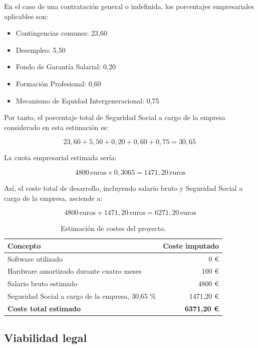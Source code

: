 En el caso de una contratación general o indefinida, los porcentajes empresariales aplicables son:

\begin{itemize}
\item Contingencias comunes: 23,60 %
\item Desempleo: 5,50 %
\item Fondo de Garantía Salarial: 0,20 %
\item Formación Profesional: 0,60 %
\item Mecanismo de Equidad Intergeneracional: 0,75 %
\end{itemize}

Por tanto, el porcentaje total de Seguridad Social a cargo de la empresa considerado en esta estimación es:

\[
23{,}60 + 5{,}50 + 0{,}20 + 0{,}60 + 0{,}75
= 30{,}65\,%
\]

La cuota empresarial estimada sería:

\[
4800\,\text{euros} \times 0{,}3065
= 1471{,}20\,\text{euros}
\]

Así, el coste total de desarrollo, incluyendo salario bruto y Seguridad Social a cargo de la empresa, asciende a:

\[
4800\,\text{euros} + 1471{,}20\,\text{euros}
= 6271{,}20\,\text{euros}
\]

\begin{table}[H]
\centering
\small
\renewcommand{\arraystretch}{1.2}
\begin{tabularx}{0.85\textwidth}{X r}
\toprule
\textbf{Concepto} & \textbf{Coste imputado} \\
\midrule
Software utilizado & 0 € \\
Hardware amortizado durante cuatro meses & 100 € \\
Salario bruto estimado & 4800 € \\
Seguridad Social a cargo de la empresa, 30,65 \% & 1471,20 € \\
\midrule
\textbf{Coste total estimado} & \textbf{6371,20 €} \\
\bottomrule
\end{tabularx}
\caption{Estimación de costes del proyecto.}
\label{tab:costes-proyecto}
\end{table}

\subsection{Viabilidad legal}
\label{subsec:a-viabilidad-legal}

